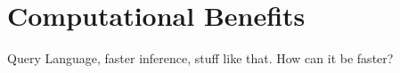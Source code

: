 \section{Computational Benefits}
\label{sec:einsum:comp_benefits}

Query Language, faster inference, stuff like that.
How can it be faster?

\blindtext[2]